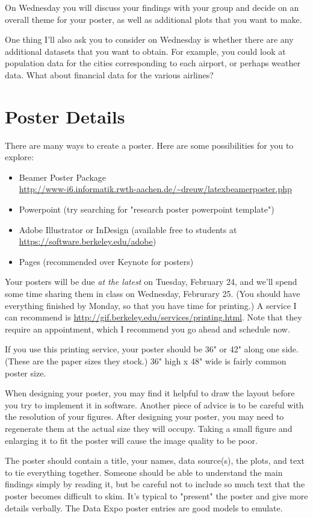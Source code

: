 \documentclass[11pt, oneside]{article}   	%
\begin{document}
On Wednesday you will discuss your findings with your group and decide on an overall theme for your poster, as well as additional plots that you want to make.

One thing I'll also ask you to consider on Wednesday is whether there are any additional datasets that you want to obtain. For example, you could look at population data for the cities corresponding to each airport, or perhaps weather data. What about financial data for the various airlines? 
\newpage
\section{Poster Details}

There are many ways to create a poster. Here are some possibilities for you to explore:
\begin{itemize}
\item Beamer Poster Package\\
 \url{http://www-i6.informatik.rwth-aachen.de/~dreuw/latexbeamerposter.php}
\item Powerpoint (try searching for "research poster powerpoint template")
\item Adobe Illustrator or InDesign (available free to students at \url{https://software.berkeley.edu/adobe})
\item Pages (recommended over Keynote for posters)
\end{itemize}

Your posters will be due {\em at the latest} on Tuesday, February 24, and we'll spend some time sharing them in class on Wednesday, Februrary 25. (You should have everything finished by Monday, so that you have time for printing.) A service I can recommend is \url{http://gif.berkeley.edu/services/printing.html}. Note that they require an appointment, which I recommend you go ahead and schedule now. 

If you use this printing service, your poster should be 36" or 42" along one side. (These are the paper sizes they stock.) 36" high x 48" wide is fairly common poster size.

When designing your poster, you may find it helpful to draw the layout before you try to implement it in software. Another piece of advice is to be careful with the resolution of your figures. After designing your poster, you may need to regenerate them at the actual size they will occupy. Taking a small figure and enlarging it to fit the poster will cause the image quality to be poor.

The poster should contain a title, your names, data source(s), the plots, and text to tie everything together. Someone should be able to understand the main findings simply by reading it, but be careful not to include so much text that the poster becomes difficult to skim. It's typical to "present" the poster and give more details verbally. The Data Expo poster entries are good models to emulate.
\end{document}
